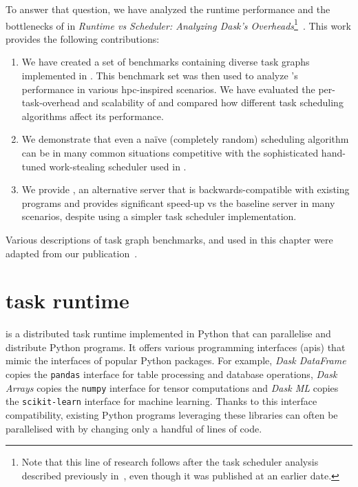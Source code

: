 To answer that question, we have analyzed the runtime performance and the bottlenecks of
\dask{} in
\emph{Runtime vs Scheduler: Analyzing Dask's Overheads}\footnote{Note that this line of research follows after the task scheduler analysis described previously
in~, even though it was published at an earlier date.}~\cite{rsds}. This work
provides the following contributions:
\begin{enumerate}
	\item We have created a set of benchmarks containing diverse task graphs implemented in
	      \dask{}. This benchmark set was then used to analyze \dask{}'s
	      performance in various \gls{hpc}-inspired scenarios. We have evaluated the
	      per-task-overhead and scalability of \dask{} and compared how different task
	      scheduling algorithms affect its performance.
	\item We demonstrate that even a naïve (completely random) scheduling algorithm can be in many common
	      situations competitive with the sophisticated hand-tuned work-stealing scheduler used in
	      \dask{}.
	\item We provide \rsds{}, an alternative \dask{} server that is
	      backwards-compatible with existing \dask{} programs and provides significant
	      speed-up vs the baseline \dask{} server in many scenarios, despite using a
	      simpler task scheduler implementation.
\end{enumerate}

Various descriptions of task graph benchmarks, \dask{} and
\rsds{} used in this chapter were adapted from our
publication~\cite{rsds}.


\section{\dask{} task runtime}
\label{sec:rsds-dask}
\dask{} is a distributed task runtime implemented in Python that can
parallelise and distribute Python programs. It offers various programming interfaces
(\glspl{api}) that mimic the interfaces of popular Python packages. For example,
\emph{Dask DataFrame} copies the \texttt{pandas}
interface for table processing and database operations, \emph{Dask Arrays} copies the
\texttt{numpy} interface for tensor computations and
\emph{Dask ML} copies the \texttt{scikit-learn}
interface for machine learning. Thanks to this interface compatibility, existing Python programs
leveraging these libraries can often be parallelised with \dask{} by changing
only a handful of lines of code.

